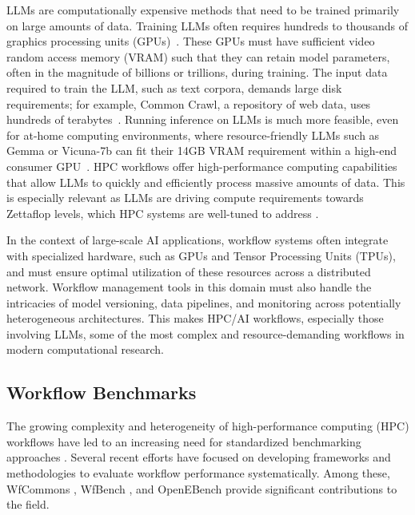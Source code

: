 LLMs are computationally expensive methods that need to be trained primarily on large amounts of data. Training LLMs often requires hundreds to thousands of graphics processing units (GPUs)~\citep{jiang2024megascalescalinglargelanguage}. These GPUs must have sufficient video random access memory (VRAM) such that they can retain model parameters, often in the magnitude of billions or trillions, during training. The input data required to train the LLM, such as text corpora, demands large disk requirements; for example, Common Crawl, a repository of web data, uses hundreds of terabytes~\citep{8311752}. Running inference on LLMs is much more feasible, even for at-home computing environments, where resource-friendly LLMs such as Gemma \citep{gemma} or Vicuna-7b can fit their 14GB VRAM requirement within a high-end consumer GPU~\citep{xu2024surveyresourceefficientllmmultimodal}.
HPC workflows offer high-performance computing capabilities that allow LLMs to quickly and efficiently process massive amounts of data. This is especially relevant as LLMs are driving compute requirements towards Zettaflop levels, which HPC systems are well-tuned to address \citep{ferreira_da_silva2024}.

In the context of large-scale AI applications, workflow systems often integrate with specialized hardware, such as GPUs and Tensor Processing Units (TPUs), and must ensure optimal utilization of these resources across a distributed network. Workflow management tools in this domain must also handle the intricacies of model versioning, data pipelines, and monitoring across potentially heterogeneous architectures. This makes HPC/AI workflows, especially those involving LLMs, some of the most complex and resource-demanding workflows in modern computational research.


\subsection{Workflow Benchmarks}

The growing complexity and heterogeneity of high-performance computing (HPC) workflows have led to an increasing need for standardized benchmarking approaches \citep{badia2024integrating}. Several recent efforts have focused on developing frameworks and methodologies to evaluate workflow performance systematically. Among these, WfCommons \citep{coleman2022-1}, WfBench \citep{coleman2022-2}, and OpenEBench \citep{Capella-Gutierrez2017} provide significant contributions to the field.

